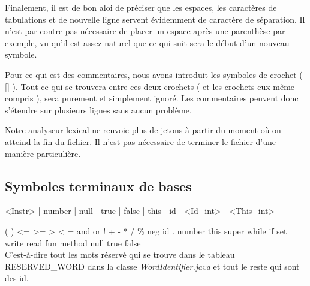Finalement, il est de bon aloi de préciser que les espaces, les caractères de tabulations et de nouvelle ligne servent évidemment de caractère de séparation. Il n'est par contre pas nécessaire de placer un espace après une parenthèse par exemple, vu qu'il est assez naturel que ce qui suit sera le début d'un nouveau symbole.

Pour ce qui est des commentaires, nous avons introduit les symboles de crochet ( [] ). Tout ce qui se trouvera entre ces deux crochets ( et les crochets eux-même compris ), sera purement et simplement ignoré. Les commentaires peuvent donc s'étendre sur plusieurs lignes sans aucun problème.

Notre analyseur lexical ne renvoie plus de jetons à partir du moment où on atteind la fin du fichier. Il n'est pas nécessaire de terminer le fichier d'une manière particulière.

\subsection{Symboles terminaux de bases}
<Instr>  | number | null | true | false | this | id | <Id_int> | <This_int>

( ) <= >= > < = and or ! + - * / \% neg id . number this super while if set write read fun method null true false \\
C'est-à-dire tout les mots réservé qui se trouve dans le tableau RESERVED_WORD dans la classe \textit{WordIdentifier.java} et tout le reste qui sont
des id.

